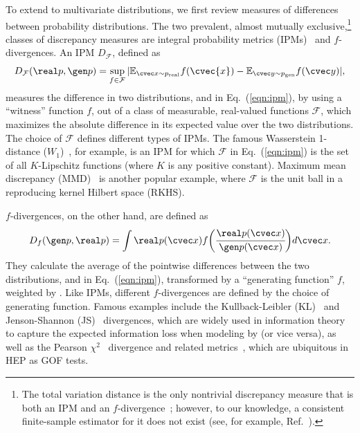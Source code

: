To extend to multivariate distributions, we first review measures of differences between probability distributions.
The two prevalent, almost mutually exclusive,\footnote{The total variation distance is the only nontrivial discrepancy measure that is both an IPM and an $f$-divergence~\cite[Appendix A]{sriperumbudur_empirical}; however, to our knowledge, a consistent finite-sample estimator for it does not exist (see, for example, Ref.~\cite[Section 5]{sriperumbudur_empirical}).} classes of discrepancy measures are integral probability metrics (IPMs)~\cite{muller_ipms} and $f$-divergences.
An IPM $D_\mathcal{F}$, defined as
\
\begin{equation}\label{eqn:ipm}
    D_\mathcal{F}(\real p, \gen p) = \sup _{f \in \mathcal F} |\mathbb E_{\cvec x \sim p_{\mathrm{real}}} f(\cvec{x}) - \mathbb E_{\cvec y \sim p_{\mathrm{gen}}} f(\cvec y)|,
\end{equation}
measures the difference in two distributions,  and  in Eq.~(\ref{eqn:ipm}), by using a ``witness'' function $f$, out of a class of measurable, real-valued functions $\mathcal{F}$, which maximizes the absolute difference in its expected value over the two distributions.
The choice of $\mathcal{F}$ defines different types of IPMs.
The famous Wasserstein 1-distance ($W_1$)~\cite{wasserstein_original,villani_ot}, for example, is an IPM for which $\mathcal F$ in Eq.~(\ref{eqn:ipm}) is the set of all $K$-Lipschitz functions (where $K$ is any positive constant).
Maximum mean discrepancy (MMD)~\cite{gretton_mmd} is another popular example, where $\mathcal F$ is the unit ball in a reproducing kernel Hilbert space (RKHS).

$f$-divergences, on the other hand, are defined as
\begin{equation}\label{eqn:fdiv}
    D_f(\gen p, \real p) = \int \real p (\cvec x) f \bigg( \cfrac{\real p (\cvec x)}{\gen p (\cvec x)} \bigg ) d\cvec x.
\end{equation}
They calculate the average of the pointwise differences between the two distributions,  and  in Eq.~(\ref{eqn:ipm}), transformed by a ``generating function'' $f$, weighted by .
Like IPMs, different $f$-divergences are defined by the choice of generating function.
Famous examples include the Kullback-Leibler (KL)~\cite{kl} and Jenson-Shannon (JS)~\cite{js_1,js_2} divergences, which are widely used in information theory to capture the expected information loss when modeling  by  (or vice versa), as well as the Pearson $\chi^2$~\cite{pearson} divergence and related metrics~\cite{Baker:1983tu,generalization_gof,parametric}, which are ubiquitous in HEP as GOF tests.

